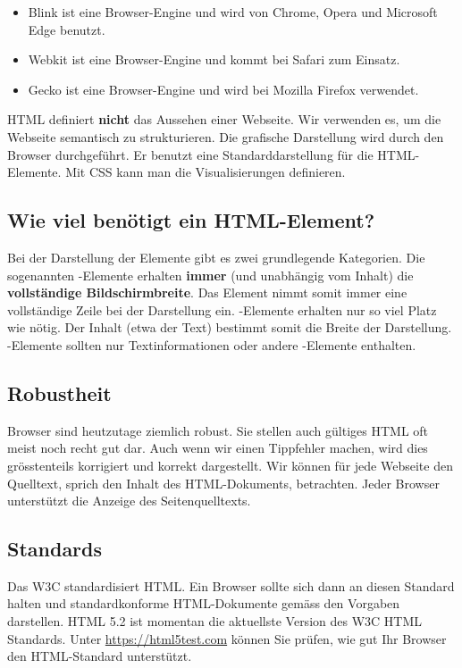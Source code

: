 \begin{itemize}
	\item Blink ist eine Browser-Engine und wird von Chrome, Opera und Microsoft Edge benutzt.
	\item Webkit ist eine Browser-Engine und kommt bei Safari zum Einsatz.
	\item Gecko ist eine Browser-Engine und wird bei Mozilla Firefox verwendet.
\end{itemize}

\begin{important}
	\ac{HTML} definiert \textbf{nicht} das Aussehen einer Webseite. Wir verwenden es, um die Webseite semantisch zu strukturieren. Die grafische Darstellung wird durch den Browser durchgeführt. Er benutzt eine Standarddarstellung für die \ac{HTML}-Elemente. Mit \ac{CSS} kann man die Visualisierungen definieren.
\end{important}

\subsection{Wie viel \protect{} benötigt ein \ac{HTML}-Element?}

Bei der Darstellung der Elemente gibt es zwei grundlegende Kategorien. Die sogenannten -Elemente erhalten \textbf{immer} (und unabhängig vom Inhalt) die \textbf{vollständige Bildschirmbreite}. Das Element nimmt somit immer eine vollständige Zeile bei der Darstellung ein. -Elemente erhalten nur so viel Platz wie nötig. Der Inhalt (etwa der Text) bestimmt somit die Breite der Darstellung. -Elemente sollten nur Textinformationen oder andere -Elemente enthalten.

\subsection{Robustheit}

Browser sind heutzutage ziemlich robust. Sie stellen auch  gültiges \ac{HTML} oft meist noch recht gut dar. Auch wenn wir einen Tippfehler machen, wird dies grösstenteils korrigiert und korrekt dargestellt. Wir können für jede Webseite den Quelltext, sprich den Inhalt des \ac{HTML}-Dokuments, betrachten. Jeder Browser unterstützt die Anzeige des Seitenquelltexts.

\subsection{Standards}

Das \ac{W3C} standardisiert \ac{HTML}. Ein Browser sollte sich dann an diesen Standard halten und standardkonforme \ac{HTML}-Dokumente gemäss den Vorgaben darstellen. \ac{HTML} 5.2 ist momentan die aktuellste Version des \ac{W3C} \ac{HTML} Standards. Unter \url{https://html5test.com} können Sie prüfen, wie gut Ihr Browser den \ac{HTML}-Standard unterstützt.